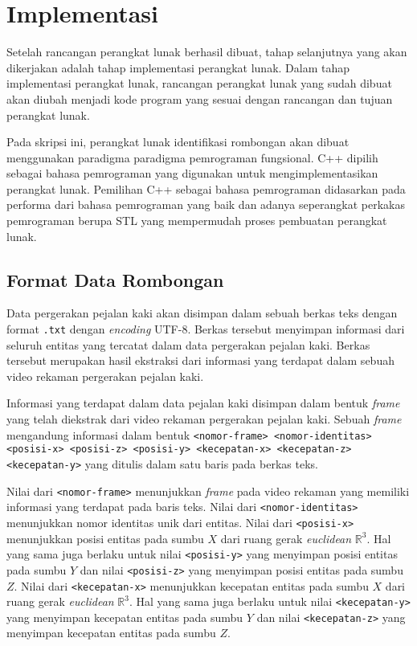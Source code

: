 \chapter{Implementasi}
\label{chap:implementasi}

Setelah rancangan perangkat lunak berhasil dibuat, tahap selanjutnya yang akan dikerjakan adalah tahap implementasi perangkat lunak. Dalam tahap implementasi perangkat lunak, rancangan perangkat lunak yang sudah dibuat akan diubah menjadi kode program yang sesuai dengan rancangan dan tujuan perangkat lunak.

Pada skripsi ini, perangkat lunak identifikasi rombongan akan dibuat menggunakan paradigma paradigma pemrograman fungsional. C++ dipilih sebagai bahasa pemrograman yang digunakan untuk mengimplementasikan perangkat lunak. Pemilihan C++ sebagai bahasa pemrograman didasarkan pada performa dari bahasa pemrograman yang baik dan adanya seperangkat perkakas pemrograman berupa STL yang mempermudah proses pembuatan perangkat lunak.

\section{Format Data Rombongan}
\label{sec:input-structure}

Data pergerakan pejalan kaki akan disimpan dalam sebuah berkas teks dengan format \texttt{.txt} dengan \textit{encoding} UTF-8. Berkas tersebut menyimpan informasi dari seluruh entitas yang tercatat dalam data pergerakan pejalan kaki. Berkas tersebut merupakan hasil ekstraksi dari informasi yang terdapat dalam sebuah video rekaman pergerakan pejalan kaki.

Informasi yang terdapat dalam data pejalan kaki disimpan dalam bentuk \textit{frame} yang telah diekstrak dari video rekaman pergerakan pejalan kaki. Sebuah \textit{frame} mengandung informasi dalam bentuk \texttt{<nomor-frame> <nomor-identitas> <posisi-x> <posisi-z> <posisi-y> <kecepatan-x> <kecepatan-z> <kecepatan-y>} yang ditulis dalam satu baris pada berkas teks.

Nilai dari \texttt{<nomor-frame>} menunjukkan \textit{frame} pada video rekaman yang memiliki informasi yang terdapat pada baris teks. Nilai dari \texttt{<nomor-identitas>} menunjukkan nomor identitas unik dari entitas. Nilai dari \texttt{<posisi-x>} menunjukkan posisi entitas pada sumbu $X$ dari ruang gerak \textit{euclidean} $\mathbb{R}^3$. Hal yang sama juga berlaku untuk nilai \texttt{<posisi-y>} yang menyimpan posisi entitas pada sumbu $Y$ dan nilai \texttt{<posisi-z>} yang menyimpan posisi entitas pada sumbu $Z$. Nilai dari \texttt{<kecepatan-x>} menunjukkan kecepatan entitas pada sumbu $X$ dari ruang gerak \textit{euclidean} $\mathbb{R}^3$. Hal yang sama juga berlaku untuk nilai \texttt{<kecepatan-y>} yang menyimpan kecepatan entitas pada sumbu $Y$ dan nilai \texttt{<kecepatan-z>} yang menyimpan kecepatan entitas pada sumbu $Z$.

